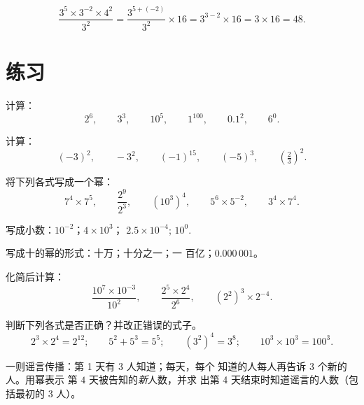 \begin{example}\label{ex:g8:powers:simplify}
\[
\frac{3^5 \times 3^{-2} \times 4^2}{3^2}
= \frac{3^{5 + (-2)}}{3^2} \times 16
= 3^{3 - 2} \times 16
= 3 \times 16 = 48 .
\]
\end{example}

\section{练习}

\begin{exercise}[$\star$]\label{exo:g8:powers:1}
计算：
\[
2^6, \qquad 3^3, \qquad 10^5, \qquad 1^{100}, \qquad 0.1^2, \qquad
6^0 .
\]
\end{exercise}

\begin{exercise}[$\star$]\label{exo:g8:powers:2}
计算：
\[
(-3)^2, \qquad -3^2, \qquad (-1)^{15}, \qquad (-5)^3, \qquad
\left(\tfrac{2}{3}\right)^2 .
\]
\end{exercise}

\begin{exercise}[$\star$]\label{exo:g8:powers:3}
将下列各式写成一个幂：
\[
7^4 \times 7^5, \qquad
\frac{2^9}{2^3}, \qquad
\left(10^3\right)^4, \qquad
5^6 \times 5^{-2}, \qquad
3^4 \times 7^4 .
\]
\end{exercise}

\begin{exercise}[$\star$]\label{exo:g8:powers:4}
写成小数：$10^{-2}$；\quad $4 \times 10^3$；\quad
$2.5 \times 10^{-4}$; \quad $10^0$.
\end{exercise}

\begin{exercise}[$\star$]\label{exo:g8:powers:5}
写成十的幂的形式：十万；十分之一；一
百亿；$0.000\,001$。
\end{exercise}

\begin{exercise}[$\star$]\label{exo:g8:powers:6}
化简后计算：
\[
\frac{10^7 \times 10^{-3}}{10^2},
\qquad
\frac{2^5 \times 2^4}{2^6},
\qquad
\left(2^2\right)^3 \times 2^{-4} .
\]
\end{exercise}

\begin{exercise}[$\star$]\label{exo:g8:powers:7}
判断下列各式是否正确？并改正错误的式子。
\[
2^3 \times 2^4 = 2^{12}; \qquad
5^2 + 5^3 = 5^5; \qquad
(3^2)^4 = 3^8; \qquad
10^3 \times 10^3 = 100^3 .
\]
\end{exercise}

\begin{exercise}[$\star\star$]\label{exo:g8:powers:8}
一则谣言传播：第 1 天有 3 人知道；每天，每个
知道的人每人再告诉 3 个新的人。用幂表示
第 $4$ 天被告知的\emph{新}人数，并求
出第 4 天结束时知道谣言的人数（包括最初的 3 人）。
\end{exercise}

